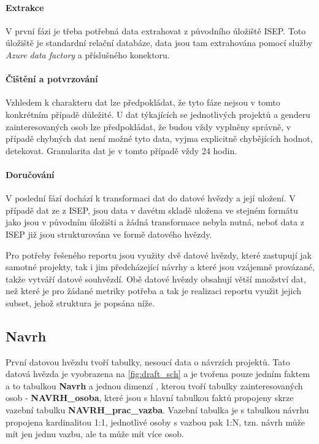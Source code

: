 \documentclass[
  digital,     %
  twoside,     %
  lof,         %
  lot,         %
]{fithesis4}
\begin{document}
\paragraph{Extrakce} V první fázi je třeba potřebná data extrahovat z původního úložiště ISEP. Toto úložiště je standardní relační databáze, data jsou tam extrahována pomocí služby \emph{Azure data factory} a příslušného konektoru. 
\paragraph{Čištění a potvrzování} Vzhledem k charakteru dat lze předpokládat, že tyto fáze nejsou v tomto konkrétním případě důležité. U dat týkajících se jednotlivých projektů a genderu zainteresovaných osob lze předpokládat, že budou vždy vyplněny správně, v případě chybných dat není možné tyto data, vyjma explicitně chybějících hodnot, detekovat. Granularita dat je v tomto případě vždy 24 hodin.
\paragraph{Doručování} V poslední fází dochází k transformaci dat do datové hvězdy a její uložení. V případě dat ze z ISEP, jsou data v davétm skladě uložena ve stejném formátu jako jsou v původním úložišti a žádná transformace nebyla nutná, neboť data z ISEP již jsou strukturována ve formě datového hvězdy. 

Pro potřeby řešeného reportu jsou využity dvě datové hvězdy, které zastupují jak samotné projekty, tak i jim předcházející návrhy a které jsou vzájemně provázané, takže vytváří datové souhvězdí. Obě datové hvězdy obsahují větší množství dat, než které je pro žádané metriky potřeba a tak je realizaci reportu využit jejich subset, jehož struktura je popsána níže. 

\subsection{Navrh}
První datovou hvězdu tvoří tabulky, nesoucí data o návrzích projektů. Tato datová hvězda je vyobrazena na \ref{fig:draft_sch} a je tvořena pouze jedním faktem a to tabulkou \textbf{Navrh} a jednou dimenzí , kterou tvoří tabulky zainteresovaných osob - \textbf{NAVRH\_osoba}, které jsou s hlavní tabulkou faktů propojeny skrze vazební tabulku \textbf{NAVRH\_prac\_vazba}. Vazební tabulka je s tabulkou návrhu propojena kardinalitou 1:1, jednotlivé osoby s vazbou pak 1:N, tzn. návrh může mít jen jednu vazbu, ale ta může mít více osob.
\end{document}
